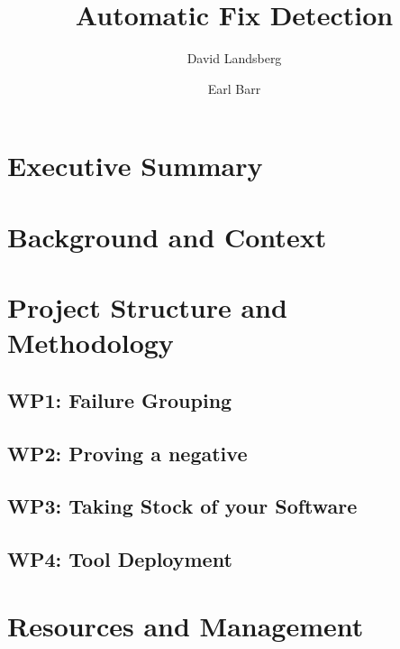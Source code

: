 \documentclass[12pt, twocolumn]{article}
\title{Automatic Fix Detection}
\author{David Landsberg \and Earl Barr}%
\date{%
}
\newcommand{\todo}[1]{{\color{red}#1}}
\begin{document}
\maketitle{}

\section{Executive Summary}
     

\section{Background and Context}
    

\section{Project Structure and Methodology}
    
    

\subsection*{WP1: Failure Grouping}
    

 


\subsection*{WP2: Proving a negative}
    
    
\subsection*{WP3: Taking Stock of your Software}
     
    
\subsection*{WP4: Tool Deployment} %
    




\section{Resources and Management}
    
\end{document}
